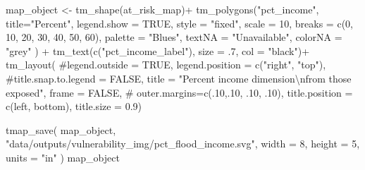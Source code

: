 \documentclass[
  letterpaper,
  DIV=11,
  numbers=noendperiod]{scrartcl}
\newenvironment{Shaded}{}{}
\newcommand{\AttributeTok}[1]{\textcolor[rgb]{0.84,0.23,0.29}{#1}}
\newcommand{\CommentTok}[1]{\textcolor[rgb]{0.42,0.45,0.49}{#1}}
\newcommand{\ConstantTok}[1]{\textcolor[rgb]{0.00,0.36,0.77}{#1}}
\newcommand{\DecValTok}[1]{\textcolor[rgb]{0.00,0.36,0.77}{#1}}
\newcommand{\FloatTok}[1]{\textcolor[rgb]{0.00,0.36,0.77}{#1}}
\newcommand{\FunctionTok}[1]{\textcolor[rgb]{0.44,0.26,0.76}{#1}}
\newcommand{\NormalTok}[1]{\textcolor[rgb]{0.14,0.16,0.18}{#1}}
\newcommand{\OtherTok}[1]{\textcolor[rgb]{0.44,0.26,0.76}{#1}}
\newcommand{\SpecialCharTok}[1]{\textcolor[rgb]{0.00,0.36,0.77}{#1}}
\newcommand{\StringTok}[1]{\textcolor[rgb]{0.01,0.18,0.38}{#1}}
\begin{document}
\begin{Shaded}
\begin{Highlighting}[]
\NormalTok{map\_object }\OtherTok{\textless{}{-}}
\FunctionTok{tm\_shape}\NormalTok{(at\_risk\_map)}\SpecialCharTok{+}
  \FunctionTok{tm\_polygons}\NormalTok{(}\StringTok{"pct\_income"}\NormalTok{,}
              \AttributeTok{title=}\StringTok{"Percent"}\NormalTok{, }
              \AttributeTok{legend.show =} \ConstantTok{TRUE}\NormalTok{,}
              \AttributeTok{style =} \StringTok{"fixed"}\NormalTok{,}
              \AttributeTok{scale =} \DecValTok{10}\NormalTok{,}
              \AttributeTok{breaks =} \FunctionTok{c}\NormalTok{(}\DecValTok{0}\NormalTok{, }\DecValTok{10}\NormalTok{, }\DecValTok{20}\NormalTok{, }\DecValTok{30}\NormalTok{, }\DecValTok{40}\NormalTok{, }\DecValTok{50}\NormalTok{, }\DecValTok{60}\NormalTok{),}
              \AttributeTok{palette =} \StringTok{"Blues"}\NormalTok{,}
              \AttributeTok{textNA =} \StringTok{"Unavailable"}\NormalTok{,}
              \AttributeTok{colorNA =} \StringTok{"grey"}
\NormalTok{              ) }\SpecialCharTok{+}
  \FunctionTok{tm\_text}\NormalTok{(}\FunctionTok{c}\NormalTok{(}\StringTok{"pct\_income\_label"}\NormalTok{), }\AttributeTok{size =}\NormalTok{ .}\DecValTok{7}\NormalTok{, }\AttributeTok{col =} \StringTok{"black"}\NormalTok{)}\SpecialCharTok{+}
  \FunctionTok{tm\_layout}\NormalTok{(}
    \CommentTok{\#legend.outside = TRUE,}
    \AttributeTok{legend.position =} \FunctionTok{c}\NormalTok{(}\StringTok{"right"}\NormalTok{, }\StringTok{"top"}\NormalTok{),}
    \CommentTok{\#title.snap.to.legend = FALSE,}
    \AttributeTok{title =} 
      \StringTok{"Percent income dimension}\SpecialCharTok{\textbackslash{}n}\StringTok{from those exposed"}\NormalTok{,}
    \AttributeTok{frame =} \ConstantTok{FALSE}\NormalTok{,}
\CommentTok{\#            outer.margins=c(.10,.10, .10, .10), }
            \AttributeTok{title.position =} \FunctionTok{c}\NormalTok{(}\StringTok{\textquotesingle{}left\textquotesingle{}}\NormalTok{, }\StringTok{\textquotesingle{}bottom\textquotesingle{}}\NormalTok{),}
            \AttributeTok{title.size =} \FloatTok{0.9}\NormalTok{)}

\FunctionTok{tmap\_save}\NormalTok{(}
\NormalTok{  map\_object,}
  \StringTok{"data/outputs/vulnerability\_img/pct\_flood\_income.svg"}\NormalTok{,}
  \AttributeTok{width =} \DecValTok{8}\NormalTok{,}
  \AttributeTok{height =} \DecValTok{5}\NormalTok{,}
  \AttributeTok{units =} \StringTok{"in"}
\NormalTok{)}
\NormalTok{map\_object}
\end{Highlighting}
\end{Shaded}
\end{document}
